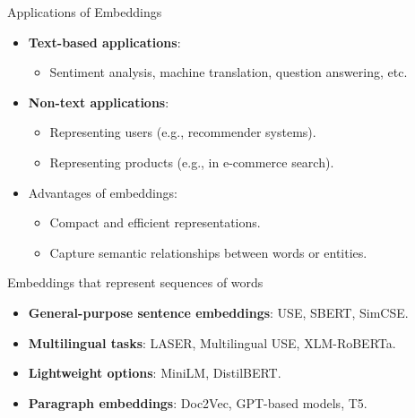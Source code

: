 \documentclass{beamer}
\begin{document}
\begin{frame}{Applications of Embeddings}
    \begin{itemize}
        \item \textbf{Text-based applications}:
        \begin{itemize}
            \item Sentiment analysis, machine translation, question answering, etc.
        \end{itemize}
        \item \textbf{Non-text applications}:
        \begin{itemize}
            \item Representing users (e.g., recommender systems).
            \item Representing products (e.g., in e-commerce search).
        \end{itemize}
        \item Advantages of embeddings:
        \begin{itemize}
            \item Compact and efficient representations.
            \item Capture semantic relationships between words or entities.
        \end{itemize}
    \end{itemize}
\end{frame}

\begin{frame}{Embeddings that represent sequences of words}
    \begin{itemize}
        \item \textbf{General-purpose sentence embeddings}: USE, SBERT, SimCSE.
        \item \textbf{Multilingual tasks}: LASER, Multilingual USE, XLM-RoBERTa.
        \item \textbf{Lightweight options}: MiniLM, DistilBERT.
        \item \textbf{Paragraph embeddings}: Doc2Vec, GPT-based models, T5.
    \end{itemize}
\end{frame}
\end{document}
